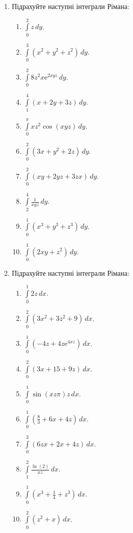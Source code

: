 \begin{enumerate}
\begin{enumerate}[label=\arabic*.]
    \end{enumerate}
\item Підрахуйте наступні інтеграли Рімана:
  \begin{enumerate}[label*=\arabic*.]
        \item $\int\limits_0^2 z \,dy$.
        \item $\int\limits_0^3 \left(x^2 + y^2 + z^2\right) \,dy$.
        \item $\int\limits_0^2 8 z^{2} x {\mathrm e}^{{2}{}{x}{}{y}{}{z}} \,dy$.
        \item $\int\limits_1^4 \left(x + 2y + 3z\right) \,dy$.
        \item $\int\limits_0^\pi {x}{}{z^{{2}}}{}{\cos}{\left({x}{}{y}{}{z}\right)} \,dy$.
        \item $\int\limits_0^2 \left(3x + y^2 + 2z\right) \,dy$.
        \item $\int\limits_0^2 \left(xy + 2yz + 3zx\right) \,dy$.
        \item $\int\limits_2^4 \frac{1}{xyz} \,dy$.
        \item $\int\limits_0^1 \left(x^3 + y^3 + z^3\right) \,dy$.
        \item $\int\limits_0^1 \left(2xy + z^2\right) \,dy$.
        \end{enumerate}
\item Підрахуйте наступні інтеграли Рімана:
    \begin{enumerate}[label*=\arabic*.]
        \item $\int\limits_0^1 2z \,dx$.
        \item $\int\limits_0^2 \left(3 x^{2}+3 z^{2}+9\right) \,dx$.
        \item $\int\limits_0^1 \left(-4 z+4 z {\mathrm e}^{4 x z}\right) \,dx$.
        \item $\int\limits_0^2 \left(3 x+15+9 z\right) \,dx$.
        \item $\int\limits_0^1 {\sin}{\left(x z \pi \right)} {z} \,dx$.
        \item $\int\limits_0^1 \left(\frac{8}{3}+6 x+4 z\right) \,dx$.
        \item $\int\limits_0^3 \left(6 z x+2 x+4 z\right) \,dx$.
        \item $\int\limits_1^2 \frac{\ln\! \left(2\right)}{x z} \,dx$.
        \item $\int\limits_0^1 \left({x^{3}+\frac{1}{4}+z^{3}}\right) \,dx$.
        \item $\int\limits_0^2 \left(z^{2}+x\right) \,dx$.
        \end{enumerate}

\end{enumerate}
